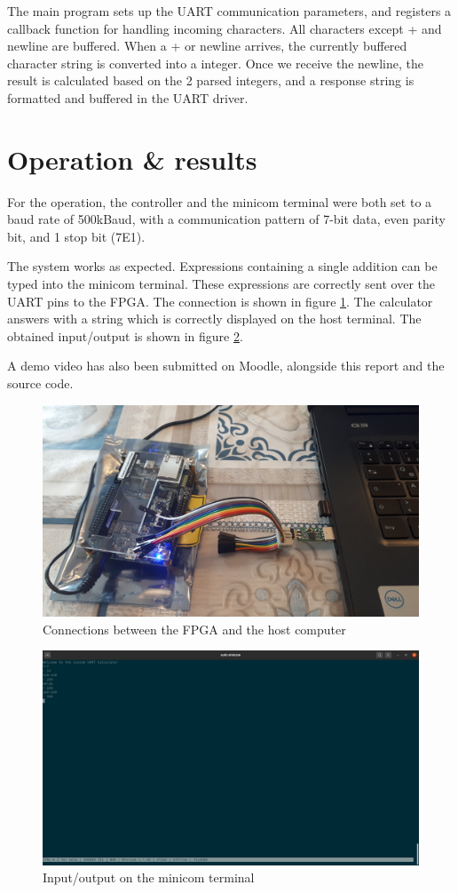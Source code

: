 \documentclass[12pt,a4paper]{article}
\begin{document}
The main program sets up the UART communication parameters, and registers a callback function for handling incoming characters. All characters except + and newline are buffered. When a + or newline arrives, the currently buffered character string is converted into a integer. Once we receive the newline, the result is calculated based on the 2 parsed integers, and a response string is formatted and buffered in the UART driver.


\section{Operation \& results}

For the operation, the controller and the minicom terminal were both set to a baud rate of 500kBaud, with a communication pattern of 7-bit data, even parity bit, and 1 stop bit (7E1).

The system works as expected. Expressions containing a single addition can be typed into the minicom terminal. These expressions are correctly sent over the UART pins to the FPGA. The connection is shown in figure \ref{fig:connection}. The calculator answers with a string which is correctly displayed on the host terminal. The obtained input/output is shown in figure \ref{fig:io}.

A demo video has also been submitted on Moodle, alongside this report and the source code.

\begin{figure}[h]
	\centering
	\includegraphics[width=\textwidth]{connections}
	\caption{Connections between the FPGA and the host computer}
	\label{fig:connection}
\end{figure}

\begin{figure}[h]
	\centering
	\includegraphics[width=\textwidth]{io}
	\caption{Input/output on the minicom terminal}
	\label{fig:io}
\end{figure}
\end{document}
